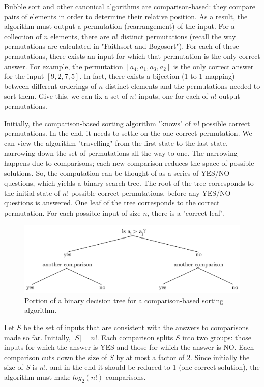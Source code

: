 \documentclass[a4paper, justified, notitlepage, sfsidenotes, notoc]{tufte-book}
\begin{document}
Bubble sort and other canonical algorithms are comparison-based: they compare pairs of elements in order to determine their relative position. As a result, the algorithm must output a permutation (rearrangement) of the input. For a collection of \(n\) elements, there are \(n!\) distinct permutations (recall the way permutations are calculated in "Faithsort and Bogosort"). For each of these permutations, there exists an input for which that permutation is the only correct answer. For example, the permutation \([a_{4}, a_{1}, a_{3}, a_{2}]\) is the only correct answer for the input \([9, 2, 7, 5]\). In fact, there exists a bijection (1-to-1 mapping) between different orderings of \(n\) distinct elements and the permutations needed to sort them. Give this, we can fix a set of \(n!\) inputs, one for each of \(n!\) output permutations.

Initially, the comparison-based sorting algorithm "knows" of \(n!\) possible correct permutations. In the end, it needs to settle on the one correct permutation. We can view the algorithm "travelling" from the first state to the last state, narrowing down the set of permutations all the way to one. The narrowing happens due to comparisons; each new comparison reduces the space of possible solutions. So, the computation can be thought of as a series of YES/NO questions, which yields a binary search tree. The root of the tree corresponds to the initial state of \(n!\) possible correct permutations, before any YES/NO questions is answered. One leaf of the tree corresponds to the correct permutation. For each possible input of size \(n\), there is a "correct leaf".

\begin{figure}[htbp]
\includegraphics[width=.5\linewidth]{./images/big_o_theta_etc/Decision_tree_comparison_search.png}
\caption{\label{}
Portion of a binary decision tree for a comparison-based sorting algorithm.}
\end{figure}
Let \(S\) be the set of inputs that are consistent with the answers to comparisons made so far. Initially, \(|S| = n!\). Each comparison splits \(S\) into two groups: those inputs for which the answer is YES and those for which the answer is NO. Each comparison cuts down the size of \(S\) by at most a factor of 2. Since initially the size of \(S\) is \(n!\), and in the end it should be reduced to 1 (one correct solution), the algorithm must make \(log_{2}(n!)\) comparisons.
\end{document}

